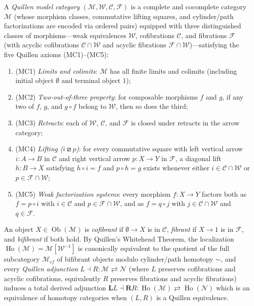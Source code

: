 A \emph{Quillen model category} $(\mathcal{M}, \mathcal{W}, \mathcal{C}, \mathcal{F})$ is a complete and cocomplete category $\mathcal{M}$ (whose morphism classes, commutative lifting squares, and cylinder/path factorizations are encoded via ordered pairs) equipped with three distinguished classes of morphisms---weak equivalences $\mathcal{W}$, cofibrations $\mathcal{C}$, and fibrations $\mathcal{F}$ (with acyclic cofibrations $\mathcal{C} \cap \mathcal{W}$ and acyclic fibrations $\mathcal{F} \cap \mathcal{W}$)---satisfying the five Quillen axioms \textup{(MC1)}--\textup{(MC5)}:
\begin{enumerate}
\item \textup{(MC1)} \emph{Limits and colimits}: $\mathcal{M}$ has all finite limits and colimits (including initial object $\emptyset$ and terminal object $1$);
\item \textup{(MC2)} \emph{Two-out-of-three property}: for composable morphisms $f$ and $g$, if any two of $f$, $g$, and $g \circ f$ belong to $\mathcal{W}$, then so does the third;
\item \textup{(MC3)} \emph{Retracts}: each of $\mathcal{W}$, $\mathcal{C}$, and $\mathcal{F}$ is closed under retracts in the arrow category;
\item \textup{(MC4)} \emph{Lifting ($i \boxslash p$)}: for every commutative square with left vertical arrow $i\colon A \to B$ in $\mathcal{C}$ and right vertical arrow $p\colon X \to Y$ in $\mathcal{F}$, a diagonal lift $h\colon B \to X$ satisfying $h \circ i = f$ and $p \circ h = g$ exists whenever either $i \in \mathcal{C} \cap \mathcal{W}$ or $p \in \mathcal{F} \cap \mathcal{W}$;
\item \textup{(MC5)} \emph{Weak factorization systems}: every morphism $f\colon X \to Y$ factors both as $f = p \circ i$ with $i \in \mathcal{C}$ and $p \in \mathcal{F} \cap \mathcal{W}$, and as $f = q \circ j$ with $j \in \mathcal{C} \cap \mathcal{W}$ and $q \in \mathcal{F}$.
\end{enumerate}
An object $X \in \operatorname{Ob}(\mathcal{M})$ is \emph{cofibrant} if $\emptyset \to X$ is in $\mathcal{C}$, \emph{fibrant} if $X \to 1$ is in $\mathcal{F}$, and \emph{bifibrant} if both hold. By Quillen's Whitehead Theorem, the localization $\operatorname{Ho}(\mathcal{M}) = \mathcal{M}[\mathcal{W}^{-1}]$ is canonically equivalent to the quotient of the full subcategory $\mathcal{M}_{cf}$ of bifibrant objects modulo cylinder/path homotopy $\sim$, and every \emph{Quillen adjunction} $L \dashv R\colon \mathcal{M} \rightleftarrows \mathcal{N}$ (where $L$ preserves cofibrations and acyclic cofibrations, equivalently $R$ preserves fibrations and acyclic fibrations) induces a total derived adjunction $\mathbf{L}L \dashv \mathbf{R}R\colon \operatorname{Ho}(\mathcal{M}) \rightleftarrows \operatorname{Ho}(\mathcal{N})$ which is an equivalence of homotopy categories when $(L, R)$ is a Quillen equivalence.

